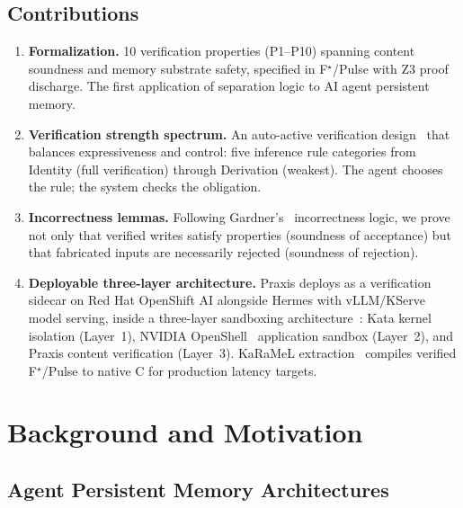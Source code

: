 \documentclass[sigplan,screen,nonacm]{acmart}
\newcommand{\fstar}{F\ensuremath{^\star}}
\begin{document}
\subsection{Contributions}

\begin{enumerate}
  \item \textbf{Formalization.} 10 verification properties (P1--P10)
    spanning content soundness and memory substrate safety, specified in
    \fstar{}/Pulse with Z3 proof discharge. The first application of
    separation logic to AI agent persistent memory.

  \item \textbf{Verification strength spectrum.} An auto-active verification
    design~\cite{leino2010dafny} that balances expressiveness and control:
    five inference rule categories from Identity (full verification) through
    Derivation (weakest). The agent chooses the rule; the system checks the
    obligation.

  \item \textbf{Incorrectness lemmas.} Following
    Gardner's~\cite{gardner2026incorrectness} incorrectness logic, we prove
    not only that verified writes satisfy properties (soundness of
    acceptance) but that fabricated inputs are necessarily rejected
    (soundness of rejection).

  \item \textbf{Deployable three-layer architecture.} Praxis deploys as a
    verification sidecar on Red Hat OpenShift AI alongside Hermes with
    vLLM/KServe model serving, inside a three-layer sandboxing
    architecture~\cite{osc2026layered}: Kata kernel isolation (Layer~1),
    NVIDIA OpenShell~\cite{nvidia2026openshell} application sandbox
    (Layer~2), and Praxis content verification (Layer~3). KaRaMeL
    extraction~\cite{protzenko2017verified} compiles verified
    \fstar{}/Pulse to native C for production latency targets.
\end{enumerate}


\section{Background and Motivation}
\label{sec:background}

\subsection{Agent Persistent Memory Architectures}
\end{document}
